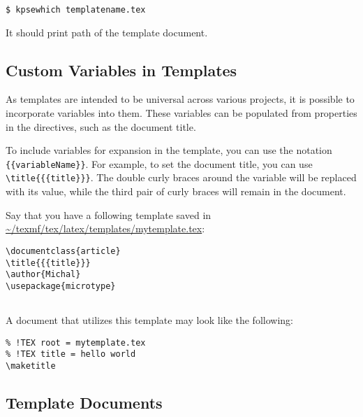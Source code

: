 \begin{verbatim}
$ kpsewhich templatename.tex
\end{verbatim}

It should print path of the template document.

\subsection{Custom Variables in Templates}

As templates are intended to be universal across various projects, it is
possible to incorporate variables into them. These variables can be populated
from properties in the directives, such as the document title.

To include variables for expansion in the template, you can use the notation
\verb|{{variableName}}|. For example, to set the document title, you can use
\texttt{\textbackslash title\{\{\{title\}\}\}}. The double curly braces around the variable will be replaced
with its value, while the third pair of curly braces will remain in the
document.

Say that you have a following template saved in \url{~/texmf/tex/latex/templates/mytemplate.tex}:

\begin{verbatim}
\documentclass{article}
\title{{{title}}}
\author{Michal}
\usepackage{microtype}


\end{verbatim}


A document that utilizes this template may look like the following:

\begin{verbatim}
% !TEX root = mytemplate.tex
% !TEX title = hello world
\maketitle
\end{verbatim}



\subsection{Template Documents}



